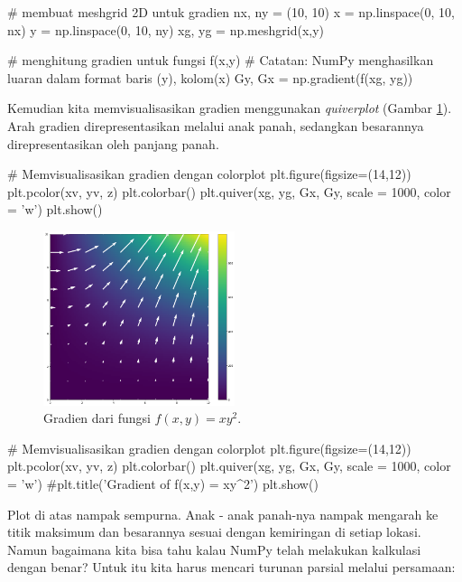 \begin{pyin}
# membuat meshgrid 2D untuk gradien
nx, ny = (10, 10)
x = np.linspace(0, 10, nx)
y = np.linspace(0, 10, ny)
xg, yg = np.meshgrid(x,y)

# menghitung gradien untuk fungsi f(x,y)
# Catatan: NumPy menghasilkan luaran dalam format baris (y), kolom(x)
Gy, Gx = np.gradient(f(xg, yg))
\end{pyin}

Kemudian kita memvisualisasikan gradien menggunakan \textit{quiverplot} (Gambar \ref{fig:fig7}). Arah gradien direpresentasikan melalui anak panah, sedangkan besarannya direpresentasikan oleh panjang panah.

\begin{pyin}
# Memvisualisasikan gradien dengan colorplot
plt.figure(figsize=(14,12))
plt.pcolor(xv, yv, z)
plt.colorbar()
plt.quiver(xg, yg, Gx, Gy, scale = 1000, color = 'w')
plt.show()
\end{pyin}

\begin{figure}[H]
    \centering
    \includegraphics[width=0.5\textwidth]{gambar/gmb7.png}
    \caption{Gradien dari fungsi $f(x,y)=xy^2$.}
    \label{fig:fig7}
\end{figure}

\begin{pyin}
# Memvisualisasikan gradien dengan colorplot
plt.figure(figsize=(14,12))
plt.pcolor(xv, yv, z)
plt.colorbar()
plt.quiver(xg, yg, Gx, Gy, scale = 1000, color = 'w')
#plt.title('Gradient of f(x,y) = xy^2')
plt.show()
\end{pyin}

Plot di atas nampak sempurna. Anak - anak panah-nya nampak mengarah ke titik maksimum dan besarannya sesuai dengan kemiringan di setiap lokasi. Namun bagaimana kita bisa tahu kalau NumPy telah melakukan kalkulasi dengan benar? Untuk itu kita harus mencari turunan parsial melalui persamaan:

